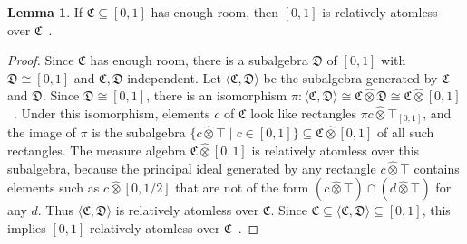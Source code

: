 \documentclass[
  sigconf,
  screen, ]{acmart}
\theoremstyle{definition}
\newtheorem{lemma}[theorem]{Lemma}
\newcommand\angled[1]{\langle #1\rangle}
\newcommand\frakC{\mathfrak C}
\newcommand\frakD{\mathfrak D}
\newcommand\fremlinf[3]{\cite[\href{https://www1.essex.ac.uk/maths/people/fremlin/chap#2.pdf\#page=#3}{#1}]{fremlin2000measure}}
\newcommand\lmafp{\mathbin{\hat\otimes}}
\begin{document}
\begin{lemma} \label{app:lem:enough-room-rel-atomless}
  If $\frakC\subseteq[0,1]$ has enough room,
  then $[0,1]$ is relatively atomless over $\frakC$~\fremlinf{331A}{33}{1}.
\end{lemma}
\begin{proof}
  Since $\frakC$ has enough room, there is a subalgebra $\frakD$
  of $[0,1]$ with $\frakD\cong[0,1]$ and $\frakC,\frakD$ independent.
  Let $\angled{\frakC,\frakD}$ be the subalgebra generated by
  $\frakC$ and $\frakD$.
  Since $\frakD\cong[0,1]$,
  there is an isomorphism
  $\pi : \angled{\frakC,\frakD}\cong \frakC\lmafp\frakD \cong \frakC\lmafp[0,1]$~\fremlinf{325L}{32}{35}.
  Under this isomorphism, elements $c$ of $\frakC$
  look like rectangles $\pi c \lmafp \top_{[0,1]}$,
  and the image of $\pi$ is the subalgebra $\{c \lmafp \top \mid c \in [0,1]\}\subseteq \frakC\lmafp[0,1]$ of all such rectangles.
  The measure algebra $\frakC\lmafp[0,1]$ is relatively atomless
  over this subalgebra, because the principal ideal generated by any rectangle $c\lmafp \top$
  contains elements such as $c\lmafp[0,1/2]$ that are not of the form $(c\lmafp\top)\cap (d\lmafp\top)$
  for any $d$.
  Thus $\angled{\frakC,\frakD}$ is relatively atomless over $\frakC$.
  Since $\frakC\subseteq\angled{\frakC,\frakD}\subseteq[0,1]$,
  this implies $[0,1]$ relatively atomless over $\frakC$~\fremlinf{331Y(a)}{33}{9}.
\end{proof}
\end{document}
